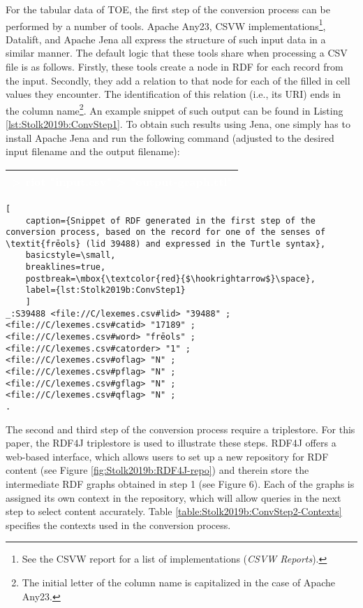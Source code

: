 For the tabular data of TOE, the first step of the conversion process can be performed by a number of tools. Apache Any23, CSVW implementations\footnote{See the CSVW report for a list of implementations (\textit{CSVW Reports}).}, Datalift, and Apache Jena all express the structure of such input data in a similar manner. The default logic that these tools share when processing a CSV file is as follows. Firstly, these tools create a node in RDF for each record from the input. Secondly, they add a relation to that node for each of the filled in cell values they encounter. The identification of this relation (i.e., its URI) ends in the column name\footnote{The initial letter of the column name is capitalized in the case of Apache Any23.}. An example snippet of such output can be found in Listing \ref{lst:Stolk2019b:ConvStep1}. To obtain such results using Jena, one simply has to install Apache Jena and run the following command (adjusted to the desired input filename and the output filename):
\begin{center}
\begin{tabular}{|p{}|} 
\hline
\rowcolor{gray}
\textcolor{white}{> riot "input.csv" > "output-graph.ttl"}\\
 \hline
\end{tabular}
\end{center}

\noindent
\begin{minipage}[c]{\textwidth}
	\begin{lstlisting}[
	caption={Snippet of RDF generated in the first step of the conversion process, based on the record for one of the senses of \textit{frēols} (lid 39488) and expressed in the Turtle syntax},
    basicstyle=\small,
    breaklines=true, 
    postbreak=\mbox{\textcolor{red}{$\hookrightarrow$}\space},
	label={lst:Stolk2019b:ConvStep1}
	]
_:S39488 <file://C/lexemes.csv#lid> "39488" ;
<file://C/lexemes.csv#catid> "17189" ;
<file://C/lexemes.csv#word> "frēols" ;
<file://C/lexemes.csv#catorder> "1" ;
<file://C/lexemes.csv#oflag> "N" ;
<file://C/lexemes.csv#pflag> "N" ;
<file://C/lexemes.csv#gflag> "N" ;
<file://C/lexemes.csv#qflag> "N" ;
.
	\end{lstlisting}
\end{minipage}


The second and third step of the conversion process require a triplestore. For this paper, the RDF4J triplestore is used to illustrate these steps. RDF4J offers a web-based interface, which allows users to set up a new repository for RDF content (see Figure \ref{fig:Stolk2019b:RDF4J-repo}) and therein store the intermediate RDF graphs obtained in step 1 (see Figure 6). Each of the graphs is assigned its own context in the repository, which will allow queries in the next step to select content accurately. Table \ref{table:Stolk2019b:ConvStep2-Contexts} specifies the contexts used in the conversion process.




